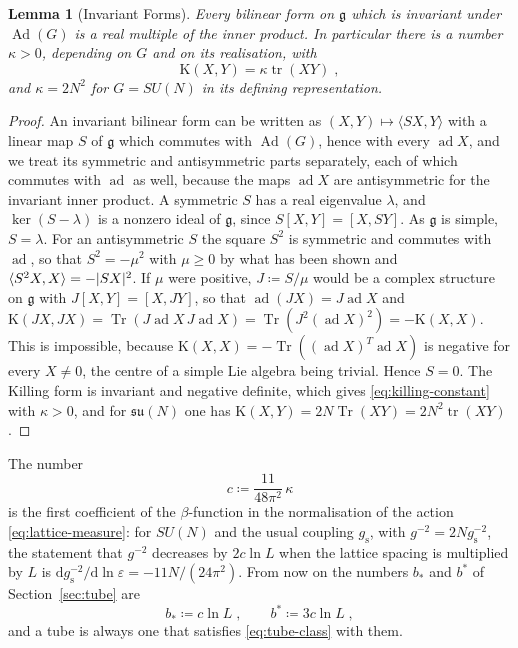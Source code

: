 \documentclass[11pt]{preprint}
\newcommand{\dd}{\mathrm{d}}
\newcommand{\tr}{\operatorname{tr}}
\DeclarePairedDelimiter{\abs}{\lvert}{\rvert}
\numberwithin{equation}{section}
\newtheorem{lemma}[theorem]{Lemma}
\theoremstyle{definition}
\theoremstyle{remark}
\theoremstyle{plain}
\begin{document}
\begin{lemma}[Invariant Forms]\label{lem:invariant-forms}
Every bilinear form on $\mathfrak g$ which is invariant under $\operatorname{Ad}(G)$ is a real multiple of the inner product. In particular there is a number $\kappa > 0$, depending on $G$ and on its realisation, with
\begin{equation}\label{eq:killing-constant}
    \mathrm K(X, Y) = \kappa\tr(XY)\;,
\end{equation}
and $\kappa = 2N^2$ for $G = SU(N)$ in its defining representation.
\end{lemma}

\begin{proof}
An invariant bilinear form can be written as $(X, Y) \mapsto \langle SX, Y \rangle$ with a linear map $S$ of $\mathfrak g$ which commutes with $\operatorname{Ad}(G)$, hence with every $\operatorname{ad}X$, and we treat its symmetric and antisymmetric parts separately, each of which commutes with $\operatorname{ad}$ as well, because the maps $\operatorname{ad}X$ are antisymmetric for the invariant inner product. A symmetric $S$ has a real eigenvalue $\lambda$, and $\ker(S - \lambda)$ is a nonzero ideal of $\mathfrak g$, since $S[X, Y] = [X, SY]$. As $\mathfrak g$ is simple, $S = \lambda$. For an antisymmetric $S$ the square $S^2$ is symmetric and commutes with $\operatorname{ad}$, so that $S^2 = -\mu^2$ with $\mu \geq 0$ by what has been shown and $\langle S^2X, X \rangle = -\abs{SX}^2$. If $\mu$ were positive, $J \coloneqq S/\mu$ would be a complex structure on $\mathfrak g$ with $J[X, Y] = [X, JY]$, so that $\operatorname{ad}(JX) = J\operatorname{ad}X$ and $\mathrm K(JX, JX) = \operatorname{Tr}(J\operatorname{ad}X\,J\operatorname{ad}X) = \operatorname{Tr}(J^2(\operatorname{ad}X)^2) = -\mathrm K(X, X)$. This is impossible, because $\mathrm K(X, X) = -\operatorname{Tr}((\operatorname{ad}X)^{T}\operatorname{ad}X)$ is negative for every $X \neq 0$, the centre of a simple Lie algebra being trivial. Hence $S = 0$. The Killing form is invariant and negative definite, which gives \eqref{eq:killing-constant} with $\kappa > 0$, and for $\mathfrak{su}(N)$ one has $\mathrm K(X, Y) = 2N\operatorname{Tr}(XY) = 2N^2\tr(XY)$.
\end{proof}

The number
\begin{equation}\label{eq:one-loop-coefficient}
    c \coloneqq \frac{11}{48\pi^2}\,\kappa
\end{equation}
is the first coefficient of the $\beta$-function in the normalisation of the action \eqref{eq:lattice-measure}: for $SU(N)$ and the usual coupling $g_{\mathrm s}$, with $g^{-2} = 2Ng_{\mathrm s}^{-2}$, the statement that $g^{-2}$ decreases by $2c\ln L$ when the lattice spacing is multiplied by $L$ is $\dd g_{\mathrm s}^{-2}/\dd\ln\varepsilon = -11N/(24\pi^2)$. From now on the numbers $b_*$ and $b^*$ of Section~\ref{sec:tube} are
\begin{equation}\label{eq:tube-class-constants}
    b_* \coloneqq c\ln L\;,
    \qquad
    b^* \coloneqq 3c\ln L\;,
\end{equation}
and a tube is always one that satisfies \eqref{eq:tube-class} with them.
\end{document}
